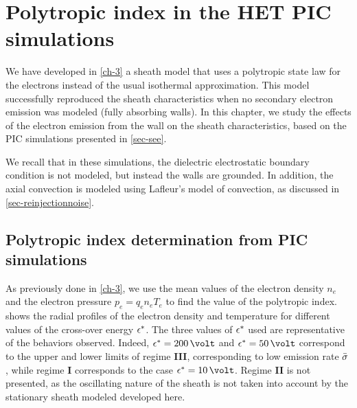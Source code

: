 

\section{Polytropic index in the \ac{HET} \ac{PIC} simulations}
\label{sec-PIC_poly}

We have developed in \cref{ch-3} a sheath model that uses a polytropic state law for the electrons instead of the usual isothermal approximation.
This model successfully reproduced the sheath characteristics  when no secondary electron emission was modeled (fully absorbing walls).
In this chapter, we study the effects of the electron emission from the wall on the sheath characteristics, based on the \ac{PIC} simulations presented in \cref{sec-see}.

We recall that in these simulations, the dielectric electrostatic boundary condition is not modeled, but instead the walls are grounded.
In addition, the axial convection is modeled using Lafleur's model of convection, as discussed in \cref{sec-reinjectionnoise}.

\subsection{Polytropic index determination from PIC simulations} \label{subsec-fluid_see_polyfit}


As previously done in \cref{ch-3}, we use the mean values of the electron density $n_e$ and the electron pressure $ p_e = q_e n_e T_e$ to find the value of the polytropic index.
 shows the radial profiles of the electron density and temperature for different values of the cross-over energy $\epsilon^{*}$.
The three values of $\epsilon^{*}$ used are representative of the behaviors observed.
Indeed, $\crover=200\,\volt$ and $\crover=50\,\volt$ correspond to the upper and lower limits of regime {\bf III}, corresponding to low emission rate $ \bar{\sigma }$, while regime {\bf I} corresponds to the case $\crover=10\,\volt$.
Regime {\bf II} is not presented, as the oscillating nature of the sheath is not taken into account by the stationary sheath modeled developed here. 


